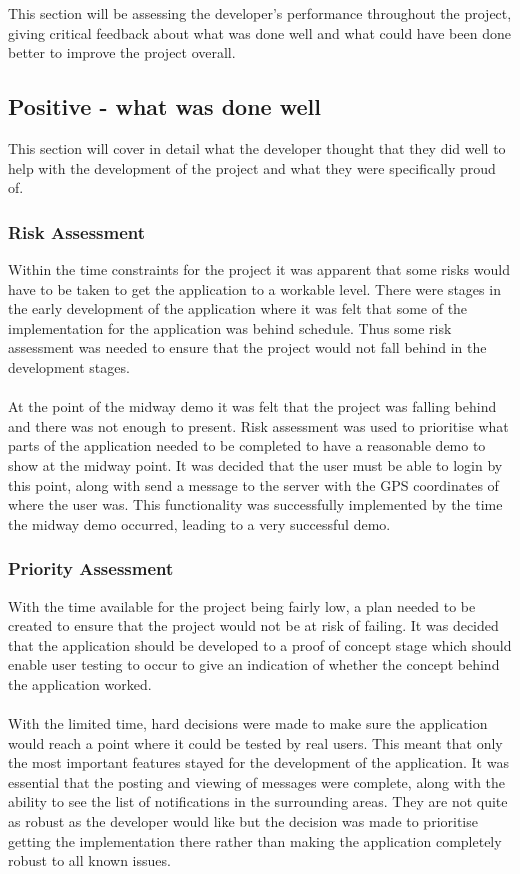 This section will be assessing the developer's performance throughout the project, giving critical feedback about what was done well and what could have been done better to improve the project overall.

\subsection{Positive - what was done well}

This section will cover in detail what the developer thought that they did well to help with the development of the project and what they were specifically proud of.

\subsubsection{Risk Assessment}

Within the time constraints for the project it was apparent that some risks would have to be taken to get the application to a workable level. There were stages in the early development of the application where it was felt that some of the implementation for the application was behind schedule. Thus some risk assessment was needed to ensure that the project would not fall behind in the development stages.\\
\\
At the point of the midway demo it was felt that the project was falling behind and there was not enough to present. Risk assessment was used to prioritise what parts of the application needed to be completed to have a reasonable demo to show at the midway point. It was decided that the user must be able to login by this point, along with send a message to the server with the GPS coordinates of where the user was. This functionality was successfully implemented by the time the midway demo occurred, leading to a very successful demo.

\subsubsection{Priority Assessment}
With the time available for the project being fairly low, a plan needed to be created to ensure that the project would not be at risk of failing. It was decided that the application should be developed to a proof of concept stage which should enable user testing to occur to give an indication of whether the concept behind the application worked.\\
\\
With the limited time, hard decisions were made to make sure the application would reach a point where it could be tested by real users. This meant that only the most important features stayed for the development of the application. It was essential that the posting and viewing of messages were complete, along with the ability to see the list of notifications in the surrounding areas. They are not quite as robust as the developer would like but the decision was made to prioritise getting the implementation there rather than making the application completely robust to all known issues.

